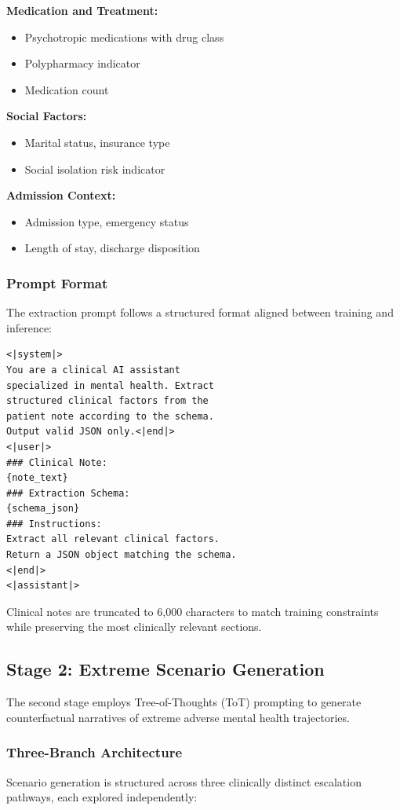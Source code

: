 \documentclass[conference]{IEEEtran}
\begin{document}
\textbf{Medication and Treatment:}
\begin{itemize}
\item Psychotropic medications with drug class
\item Polypharmacy indicator
\item Medication count
\end{itemize}

\textbf{Social Factors:}
\begin{itemize}
\item Marital status, insurance type
\item Social isolation risk indicator
\end{itemize}

\textbf{Admission Context:}
\begin{itemize}
\item Admission type, emergency status
\item Length of stay, discharge disposition
\end{itemize}

\subsubsection{Prompt Format}
The extraction prompt follows a structured format aligned between training and inference:

\begin{verbatim}
<|system|>
You are a clinical AI assistant 
specialized in mental health. Extract 
structured clinical factors from the 
patient note according to the schema.
Output valid JSON only.<|end|>
<|user|>
### Clinical Note:
{note_text}
### Extraction Schema:
{schema_json}
### Instructions:
Extract all relevant clinical factors.
Return a JSON object matching the schema.
<|end|>
<|assistant|>
\end{verbatim}

Clinical notes are truncated to 6,000 characters to match training constraints while preserving the most clinically relevant sections.

\subsection{Stage 2: Extreme Scenario Generation}

The second stage employs Tree-of-Thoughts (ToT) prompting to generate counterfactual narratives of extreme adverse mental health trajectories.

\subsubsection{Three-Branch Architecture}
Scenario generation is structured across three clinically distinct escalation pathways, each explored independently:
\end{document}
